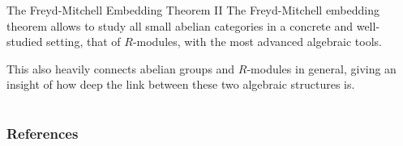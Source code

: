 \documentclass{beamer}
\begin{document}
\begin{frame}{The Freyd-Mitchell Embedding Theorem II}
    The Freyd-Mitchell embedding theorem allows to study all small
    abelian categories in a concrete and well-studied setting, that
    of $R$-modules, with the most advanced algebraic tools. \medskip

    This also heavily connects abelian groups and $R$-modules in general,
    giving an insight of how deep the link between these two
    algebraic structures is.
\end{frame}


\section*{}

\nocite{*}

\begin{frame}
        \frametitle{References}
        \printbibliography
\end{frame}
\end{document}
